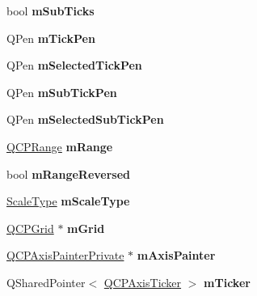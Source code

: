 \begin{DoxyCompactItemize}
bool {\bfseries m\+Sub\+Ticks}
\item 
\mbox{\label{class_q_c_p_axis_a1d52c78c856d8bd1f331d4ec4e63d944}} 
Q\+Pen {\bfseries m\+Tick\+Pen}
\item 
\mbox{\label{class_q_c_p_axis_a9524593dbc75a5c5b29dbd1cb4b37df5}} 
Q\+Pen {\bfseries m\+Selected\+Tick\+Pen}
\item 
\mbox{\label{class_q_c_p_axis_a32ef56d3a417866720eb12667d27dbd1}} 
Q\+Pen {\bfseries m\+Sub\+Tick\+Pen}
\item 
\mbox{\label{class_q_c_p_axis_aa5cc6afc5dc2a365f5abbd36eb04a1dc}} 
Q\+Pen {\bfseries m\+Selected\+Sub\+Tick\+Pen}
\item 
\mbox{\label{class_q_c_p_axis_a1ee36773c49062d751560e11f90845f7}} 
\hyperlink{class_q_c_p_range}{Q\+C\+P\+Range} {\bfseries m\+Range}
\item 
\mbox{\label{class_q_c_p_axis_a5cb034f57aa3d773a9ca55a0931dbf7b}} 
bool {\bfseries m\+Range\+Reversed}
\item 
\mbox{\label{class_q_c_p_axis_ad706039549cbbbec5fcb2baf7894e04d}} 
\hyperlink{class_q_c_p_axis_a36d8e8658dbaa179bf2aeb973db2d6f0}{Scale\+Type} {\bfseries m\+Scale\+Type}
\item 
\mbox{\label{class_q_c_p_axis_a17bffb94aaa40311f259c6ac7bcb5d5f}} 
\hyperlink{class_q_c_p_grid}{Q\+C\+P\+Grid} $\ast$ {\bfseries m\+Grid}
\item 
\mbox{\label{class_q_c_p_axis_aeeae00935bd2dab82d64f32544a90913}} 
\hyperlink{class_q_c_p_axis_painter_private}{Q\+C\+P\+Axis\+Painter\+Private} $\ast$ {\bfseries m\+Axis\+Painter}
\item 
\mbox{\label{class_q_c_p_axis_ad9c3061cbd8bec5b0755d5a0bef3b700}} 
Q\+Shared\+Pointer$<$ \hyperlink{class_q_c_p_axis_ticker}{Q\+C\+P\+Axis\+Ticker} $>$ {\bfseries m\+Ticker}
\item 
\mbox{\label{class_q_c_p_axis_aae0f9b9973b85be601200f00f5825087}} 

\end{DoxyCompactItemize}
